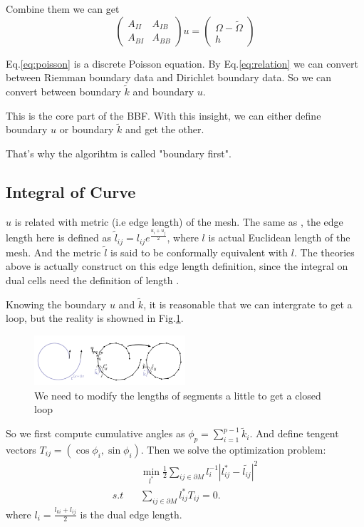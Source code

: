 \documentclass[fleqn,10pt]{wlscirep}
\begin{document}
Combine them we can get 
\begin{equation}
\left(\begin{matrix}
A_{II} & A_{IB}\\
A_{BI} & A_{BB}
\end{matrix}\right) u
= \left(\begin{matrix}
\Omega - \tilde{\Omega}\\
h\end{matrix}\right)
\label{eq:relation}
\end{equation}

Eq.\ref{eq:poisson} is a discrete Poisson equation. By Eq.\ref{eq:relation} we can convert between Riemman boundary data and Dirichlet boundary data. So we can convert between boundary $\tilde{k}$ and boundary $u$.

This is the core part of the BBF. With this insight, we can either define boundary $u$ or boundary $\tilde{k}$ and get the other.

That's why the algorihtm is called "boundary first".

\subsection{Integral of Curve}
$u$ is related with metric (i.e edge length) of the mesh. The same as \cite{Springborn:2008:CET:1360612.1360676}, the edge length here is defined as $\tilde{l}_{ij} = l_{ij}e^{\frac{u_i + u_j}{2}}$, where $l$ is actual Euclidean length of the mesh. And the metric $\tilde{l}$ is said to be conformally equivalent with $l$. The theories above is actually construct on this edge length definition, since the integral on dual cells need the definition of length
.

Knowing the boundary $u$ and $\tilde{k}$, it is reasonable that we can intergrate to get a loop, but the reality is showned in Fig.\ref{fig:loop}.

\begin{figure}
\centering
\includegraphics[width=0.5\textwidth]{images/loop}
\caption{We need to modify the lengths of segments a little to get a closed loop}
\label{fig:loop}
\end{figure}

So we first compute cumulative angles as $ \phi_p = \sum_{i = 1}^{p-1}\tilde{k}_i$. And define tengent vectors $T_{ij} = (\cos \phi_i, \sin \phi_i)$. Then we solve the optimization problem:
\begin{equation}
\begin{split}
&\min_{l^*} \frac{1}{2}\sum_{ij \in \partial M}l_i^{-1} |l^*_{ij} - \tilde{l_{ij}}|^2\\
s.t  \ \ \ \ &\sum_{ij\in \partial M}l^*_{ij}T_{ij} = 0.
\end{split}
\end{equation}
where $l_i = \frac{l_{ki} + l_{ij}}{2}$ is the dual edge length.
\end{document}
